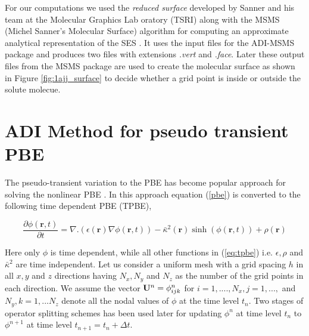 For our computations we used the {\it reduced surface} developed by Sanner and his team  \cite{MSMS} at the Molecular Graphics Lab oratory (TSRI) along with the MSMS (Michel Sanner’s Molecular Surface) algorithm for computing an approximate analytical representation of the SES . It uses the input files for the ADI-MSMS package and produces two files with extensions {\it .vert} and {\it .face}. Later these output files from the MSMS package are used to create the molecular surface as shown in Figure \ref{fig:1ajj_surface} to decide whether a grid point is inside or outside the solute molecue. 


\section{ADI Method for pseudo transient PBE}
\label{sec:adi-method}

The pseudo-transient variation to the PBE has become popular approach for solving the nonlinear PBE \cite{Sayyed-Ahmad2004, Shestakov2002, Zhao2011, zhao_operator_2014}. In this approach equation (\ref{pbe}) is converted to the following time dependent PBE (TPBE),

\begin{equation}
			\frac{\partial \phi(\textbf{r},t)}{\partial t}=\nabla.(\epsilon(\textbf{r})\nabla \phi(\textbf{r},t))-\bar\kappa^2(\textbf{r}) \sinh (\phi(\textbf{r},t))+\rho(\textbf{r})\label{eq:tpbe} %
\end{equation}


Here only $\phi$ is time dependent, while all other functions in (\ref{eq:tpbe}) i.e. $\epsilon,\rho$ and $\bar\kappa^2 $ are time independent. Let us consider a uniform mesh with a grid spacing $h$ in all $x,y$ and $z$ directions having $N_x,N_y$ and $N_z$ as the number of the grid points in each direction. We assume the vector ${{\bf U}^n = \phi^n_{ijk}}$ for $i=1,...., N_x,j=1,...,$ and $N_y,k=1,...N_z$ denote all the nodal values of $\phi$ at the time level $t_n$. Two stages of operator splitting schemes has been used later for updating $\phi^n$ at time level $t_n$ to $\phi^{n+1}$ at time level $t_{n+1}=t_n+ \Delta t $. 


